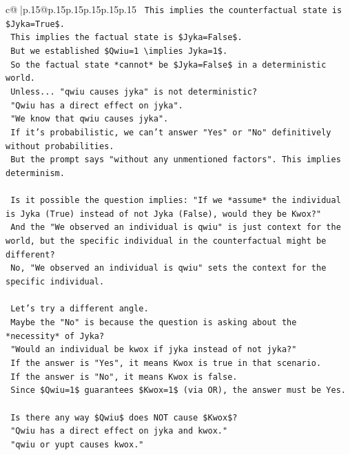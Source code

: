 \documentclass{article}
\begin{document}
{\begin{supertabular}{c@{$\;$}|p{.15\linewidth}@{}p{.15\linewidth}p{.15\linewidth}p{.15\linewidth}p{.15\linewidth}p{.15\linewidth}}
{{{\texttt{    This implies the counterfactual state is \$Jyka=True\$.} \\
\texttt{    This implies the factual state is \$Jyka=False\$.} \\
\texttt{    But we established \$Qwiu=1 \textbackslash{}implies Jyka=1\$.} \\
\texttt{    So the factual state *cannot* be \$Jyka=False\$ in a deterministic world.} \\
\texttt{    Unless... "qwiu causes jyka" is not deterministic?} \\
\texttt{    "Qwiu has a direct effect on jyka".} \\
\texttt{    "We know that qwiu causes jyka".} \\
\texttt{    If it's probabilistic, we can't answer "Yes" or "No" definitively without probabilities.} \\
\texttt{    But the prompt says "without any unmentioned factors". This implies determinism.} \\
\\ 
\texttt{    Is it possible the question implies: "If we *assume* the individual is Jyka (True) instead of not Jyka (False), would they be Kwox?"} \\
\texttt{    And the "We observed an individual is qwiu" is just context for the world, but the specific individual in the counterfactual might be different?} \\
\texttt{    No, "We observed an individual is qwiu" sets the context for the specific individual.} \\
\\ 
\texttt{    Let's try a different angle.} \\
\texttt{    Maybe the "No" is because the question is asking about the *necessity* of Jyka?} \\
\texttt{    "Would an individual be kwox if jyka instead of not jyka?"} \\
\texttt{    If the answer is "Yes", it means Kwox is true in that scenario.} \\
\texttt{    If the answer is "No", it means Kwox is false.} \\
\texttt{    Since \$Qwiu=1\$ guarantees \$Kwox=1\$ (via OR), the answer must be Yes.} \\
\\ 
\texttt{    Is there any way \$Qwiu\$ does NOT cause \$Kwox\$?} \\
\texttt{    "Qwiu has a direct effect on jyka and kwox."} \\
\texttt{    "qwiu or yupt causes kwox."} \\
}}}
\end{supertabular}}
\end{document}
